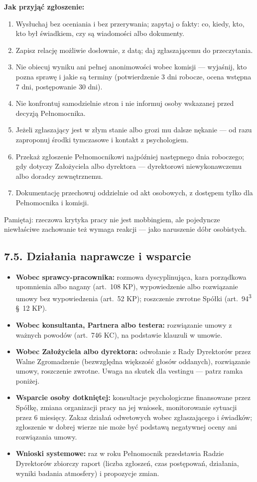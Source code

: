 \documentclass[11pt,a4paper]{report}
\begin{document}
\begin{DlaHR}
\textbf{Jak przyjąć zgłoszenie:}
\begin{enumerate}
  \item Wysłuchaj bez oceniania i bez przerywania; zapytaj o fakty: co, kiedy, kto, kto był świadkiem, czy są wiadomości albo dokumenty.
  \item Zapisz relację możliwie dosłownie, z datą; daj zgłaszającemu do przeczytania.
  \item Nie obiecuj wyniku ani pełnej anonimowości wobec komisji --- wyjaśnij, kto pozna sprawę i jakie są terminy (potwierdzenie 3 dni robocze, ocena wstępna 7 dni, postępowanie 30 dni).
  \item Nie konfrontuj samodzielnie stron i nie informuj osoby wskazanej przed decyzją Pełnomocnika.
  \item Jeżeli zgłaszający jest w złym stanie albo grozi mu dalsze nękanie --- od razu zaproponuj środki tymczasowe i kontakt z psychologiem.
  \item Przekaż zgłoszenie Pełnomocnikowi najpóźniej następnego dnia roboczego; gdy dotyczy Założyciela albo dyrektora --- dyrektorowi niewykonawczemu albo doradcy zewnętrznemu.
  \item Dokumentację przechowuj oddzielnie od akt osobowych, z dostępem tylko dla Pełnomocnika i komisji.
\end{enumerate}
Pamiętaj: rzeczowa krytyka pracy nie jest mobbingiem, ale pojedyncze niewłaściwe zachowanie też wymaga reakcji --- jako naruszenie dóbr osobistych.
\end{DlaHR}

\subsection*{7.5. Działania naprawcze i wsparcie}
\begin{itemize}
  \item \textbf{Wobec sprawcy-pracownika:} rozmowa dyscyplinująca, kara porządkowa upomnienia albo nagany (art.~108 KP), wypowiedzenie albo rozwiązanie umowy bez wypowiedzenia (art.~52 KP); roszczenie zwrotne Spółki (art.~94\textsuperscript{3} §~12 KP).
  \item \textbf{Wobec konsultanta, Partnera albo testera:} rozwiązanie umowy z ważnych powodów (art.~746 KC), na podstawie klauzuli w umowie.
  \item \textbf{Wobec Założyciela albo dyrektora:} odwołanie z Rady Dyrektorów przez Walne Zgromadzenie (bezwzględna większość głosów oddanych), rozwiązanie umowy, roszczenie zwrotne. Uwaga na skutek dla vestingu --- patrz ramka poniżej.
  \item \textbf{Wsparcie osoby dotkniętej:} konsultacje psychologiczne finansowane przez Spółkę, zmiana organizacji pracy na jej wniosek, monitorowanie sytuacji przez 6 miesięcy. Zakaz działań odwetowych wobec zgłaszającego i świadków; zgłoszenie w dobrej wierze nie może być podstawą negatywnej oceny ani rozwiązania umowy.
  \item \textbf{Wnioski systemowe:} raz w roku Pełnomocnik przedstawia Radzie Dyrektorów zbiorczy raport (liczba zgłoszeń, czas postępowań, działania, wyniki badania atmosfery) i propozycje zmian.
\end{itemize}
\end{document}
